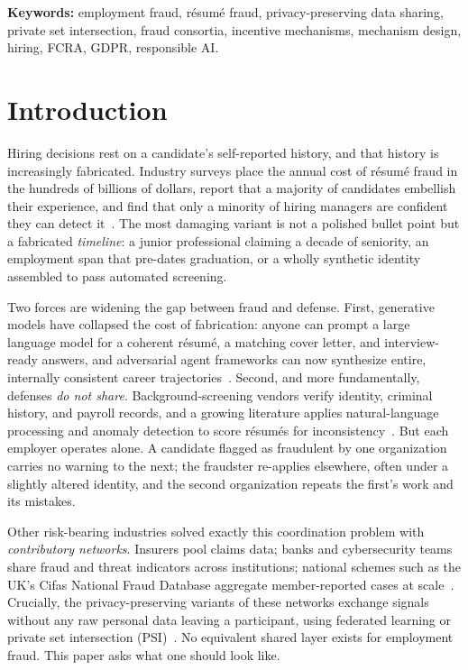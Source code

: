 \documentclass[11pt]{article}
\begin{document}
\noindent\textbf{Keywords:} employment fraud, r\'esum\'e fraud,
privacy-preserving data sharing, private set intersection, fraud consortia,
incentive mechanisms, mechanism design, hiring, FCRA, GDPR, responsible AI.

\tableofcontents
\newpage

\section{Introduction}\label{sec:intro}
Hiring decisions rest on a candidate's self-reported history, and that history is
increasingly fabricated. Industry surveys place the annual cost of r\'esum\'e
fraud in the hundreds of billions of dollars, report that a majority of
candidates embellish their experience, and find that only a minority of hiring
managers are confident they can detect it~\cite{resumefraud2025}. The most
damaging variant is not a polished bullet point but a fabricated \emph{timeline}:
a junior professional claiming a decade of seniority, an employment span that
pre-dates graduation, or a wholly synthetic identity assembled to pass automated
screening.

Two forces are widening the gap between fraud and defense. First, generative
models have collapsed the cost of fabrication: anyone can prompt a large language
model for a coherent r\'esum\'e, a matching cover letter, and interview-ready
answers, and adversarial agent frameworks can now synthesize entire, internally
consistent career trajectories~\cite{fakecareers2025,agentgen2025}. Second, and
more fundamentally, defenses \emph{do not share}. Background-screening vendors
verify identity, criminal history, and payroll records, and a growing literature
applies natural-language processing and anomaly detection to score r\'esum\'es
for inconsistency~\cite{resumefraud2025,resumeml}. But each employer operates
alone. A candidate flagged as fraudulent by one organization carries no warning
to the next; the fraudster re-applies elsewhere, often under a slightly altered
identity, and the second organization repeats the first's work and its mistakes.

Other risk-bearing industries solved exactly this coordination problem with
\emph{contributory networks}. Insurers pool claims data; banks and cybersecurity
teams share fraud and threat indicators across institutions; national schemes
such as the UK's Cifas National Fraud Database aggregate member-reported cases at
scale~\cite{cifas}. Crucially, the privacy-preserving variants of these networks
exchange signals without any raw personal data leaving a participant, using
federated learning or private set intersection
(PSI)~\cite{starlit2024,otpsi2026}. No equivalent shared layer exists for
employment fraud. This paper asks what one should look like.
\end{document}
